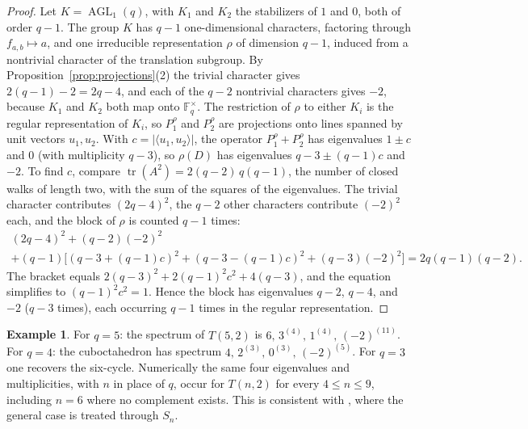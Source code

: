 \documentclass[12pt,letterpaper]{article}
\numberwithin{equation}{section}
\theoremstyle{definition}
\newtheorem{example}[theorem]{Example}
\DeclareMathOperator{\agll}{AGL}
\DeclareMathOperator{\tr}{tr}
\begin{document}
\begin{proof}
Let $K=\agll_1(q)$, with $K_1$ and $K_2$ the stabilizers of $1$ and $0$, both of order $q-1$. The group $K$ has $q-1$ one-dimensional characters, factoring through $f_{a,b}\mapsto a$, and one irreducible representation $\rho$ of dimension $q-1$, induced from a nontrivial character of the translation subgroup. By Proposition~\ref{prop:projections}(2) the trivial character gives $2(q-1)-2=2q-4$, and each of the $q-2$ nontrivial characters gives $-2$, because $K_1$ and $K_2$ both map onto $\mathbb F_q^\times$. The restriction of $\rho$ to either $K_i$ is the regular representation of $K_i$, so $P_1^\rho$ and $P_2^\rho$ are projections onto lines spanned by unit vectors $u_1,u_2$. With $c=|\langle u_1,u_2\rangle|$, the operator $P_1^\rho+P_2^\rho$ has eigenvalues $1\pm c$ and $0$ (with multiplicity $q-3$), so $\rho(D)$ has eigenvalues $q-3\pm(q-1)c$ and $-2$. To find $c$, compare $\tr(A^2)=2(q-2)\,q(q-1)$, the number of closed walks of length two, with the sum of the squares of the eigenvalues. The trivial character contributes $(2q-4)^2$, the $q-2$ other characters contribute $(-2)^2$ each, and the block of $\rho$ is counted $q-1$ times:
\begin{multline*}
(2q-4)^2+(q-2)(-2)^2\\
+(q-1)\bigl[(q-3+(q-1)c)^2+(q-3-(q-1)c)^2+(q-3)(-2)^2\bigr]=2q(q-1)(q-2).
\end{multline*}
The bracket equals $2(q-3)^2+2(q-1)^2c^2+4(q-3)$, and the equation simplifies to $(q-1)^2c^2=1$. Hence the block has eigenvalues $q-2$, $q-4$, and $-2$ ($q-3$ times), each occurring $q-1$ times in the regular representation.
\end{proof}
\begin{example}
For $q=5$: the spectrum of $T(5,2)$ is $6,\,3^{(4)},\,1^{(4)},\,(-2)^{(11)}$. For $q=4$: the cuboctahedron has spectrum $4,\,2^{(3)},\,0^{(3)},\,(-2)^{(5)}$. For $q=3$ one recovers the six-cycle. Numerically the same four eigenvalues and multiplicities, with $n$ in place of $q$, occur for $T(n,2)$ for every $4\leq n\leq9$, including $n=6$ where no complement exists. This is consistent with \cite{CGW14,AB16}, where the general case is treated through $S_n$.
\end{example}
\end{document}
